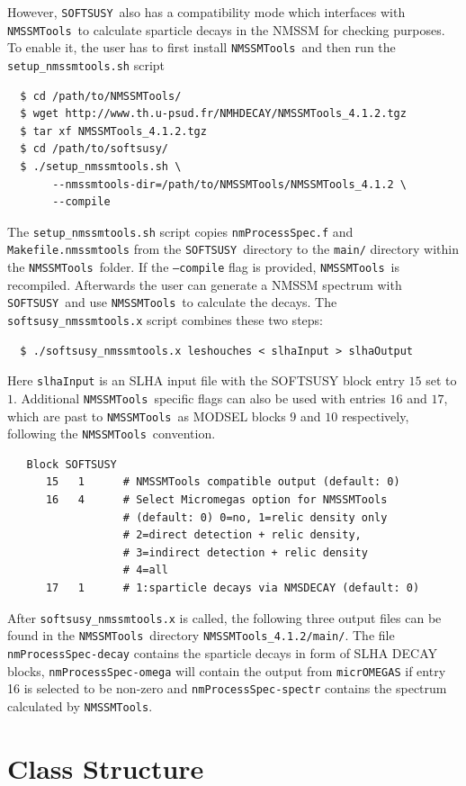 \documentclass[final,3p,times]{elsarticle}
\def\SOFTSUSY{{\tt SOFTSUSY}}
\def\NMSSMTools{{\tt NMSSMTools}}
\def\code#1{\small{\tt #1}\normalsize}
\begin{document}
However,
\SOFTSUSY\ also has a compatibility mode which interfaces with \NMSSMTools\
to calculate sparticle decays in the NMSSM for checking purposes.  To enable it, the
user has to first install \NMSSMTools\ and then run the
\code{setup\_nmssmtools.sh} script
%
\begin{verbatim}
  $ cd /path/to/NMSSMTools/
  $ wget http://www.th.u-psud.fr/NMHDECAY/NMSSMTools_4.1.2.tgz
  $ tar xf NMSSMTools_4.1.2.tgz
  $ cd /path/to/softsusy/
  $ ./setup_nmssmtools.sh \
       --nmssmtools-dir=/path/to/NMSSMTools/NMSSMTools_4.1.2 \
       --compile
\end{verbatim}
%
The \code{setup\_nmssmtools.sh} script copies \code{nmProcessSpec.f}
and \code{Makefile.nmssmtools} from the \SOFTSUSY\ directory to the
{\tt main/} directory within the \NMSSMTools\ folder.  If the \code{--compile}
flag is provided, \NMSSMTools\ is recompiled.  Afterwards the user can
generate a NMSSM spectrum with \SOFTSUSY\ and use \NMSSMTools\ to
calculate the decays.  The \code{softsusy\_nmssmtools.x} script combines
these two steps:
%
\begin{verbatim}
  $ ./softsusy_nmssmtools.x leshouches < slhaInput > slhaOutput
\end{verbatim}
%
Here \code{slhaInput} is an SLHA input file with the SOFTSUSY block
entry $15$ set to $1$.  Additional \NMSSMTools\ specific flags can also
be used with entries $16$ and $17$, which are past to \NMSSMTools\ as
MODSEL blocks $9$ and $10$ respectively, following the \NMSSMTools\
convention.
%
\begin{verbatim}
   Block SOFTSUSY
      15   1      # NMSSMTools compatible output (default: 0) 
      16   4      # Select Micromegas option for NMSSMTools
                  # (default: 0) 0=no, 1=relic density only
                  # 2=direct detection + relic density, 
                  # 3=indirect detection + relic density
                  # 4=all  
      17   1      # 1:sparticle decays via NMSDECAY (default: 0)
\end{verbatim}
%
After \code{softsusy\_nmssmtools.x} is called, the following three output
files can be found in the \NMSSMTools\ directory
\code{NMSSMTools\_4.1.2/main/}. The file \code{nmProcessSpec-decay}
contains the sparticle decays in form of SLHA DECAY blocks,
\code{nmProcessSpec-omega} will contain the output from \code{micrOMEGAS} if entry 16 is selected to be non-zero and
\code{nmProcessSpec-spectr} contains the spectrum calculated by
\NMSSMTools.

\section{Class Structure\label{sec:objects}}
\end{document}
